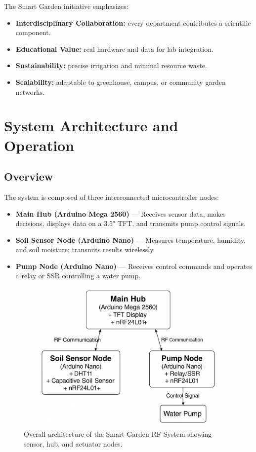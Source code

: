 \documentclass[12pt,a4paper]{article}
\begin{document}
The Smart Garden initiative emphasizes:
\begin{itemize}
  \item \textbf{Interdisciplinary Collaboration:} every department contributes a scientific component.
  \item \textbf{Educational Value:} real hardware and data for lab integration.
  \item \textbf{Sustainability:} precise irrigation and minimal resource waste.
  \item \textbf{Scalability:} adaptable to greenhouse, campus, or community garden networks.
\end{itemize}

\clearpage
\section{System Architecture and Operation}

\subsection{Overview}
The system is composed of three interconnected microcontroller nodes:
\begin{itemize}
  \item \textbf{Main Hub (Arduino Mega 2560)} — Receives sensor data, makes decisions, displays data on a 3.5" TFT, and transmits pump control signals.
  \item \textbf{Soil Sensor Node (Arduino Nano)} — Measures temperature, humidity, and soil moisture; transmits results wirelessly.
  \item \textbf{Pump Node (Arduino Nano)} — Receives control commands and operates a relay or SSR controlling a water pump.
\end{itemize}

\begin{figure}[H]\centering
\includegraphics[width=0.9\linewidth]{figs/architecture_placeholder.png}
\caption{Overall architecture of the Smart Garden RF System showing sensor, hub, and actuator nodes.}
\end{figure}
\end{document}
